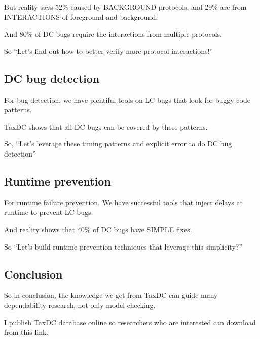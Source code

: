 
But reality says 52\% caused by BACKGROUND protocols, and 29\% are from
INTERACTIONS of foreground and background.

And 80\% of DC bugs require the interactions from multiple protocols.

So ``Let's find out how to better verify more protocol interactions!''

\subsection{DC bug detection}

For bug detection, we have plentiful tools on LC bugs that look for buggy code
patterns.


TaxDC shows that all DC bugs can be covered by these patterns.



So, ``Let's leverage these timing patterns and explicit error to do DC bug
detection''

%
%

\subsection{Runtime prevention}

For runtime failure prevention. We have successful tools that inject delays at
runtime to prevent LC bugs.

And reality shows that 40\% of DC bugs have SIMPLE fixes. 

So ``Let's build runtime prevention techniques that leverage this simplicity?''

\subsection{Conclusion}

So in conclusion, the knowledge we get from TaxDC can guide many dependability
research, not only model checking.

I publish TaxDC database online so researchers who are interested can download
from this link.

